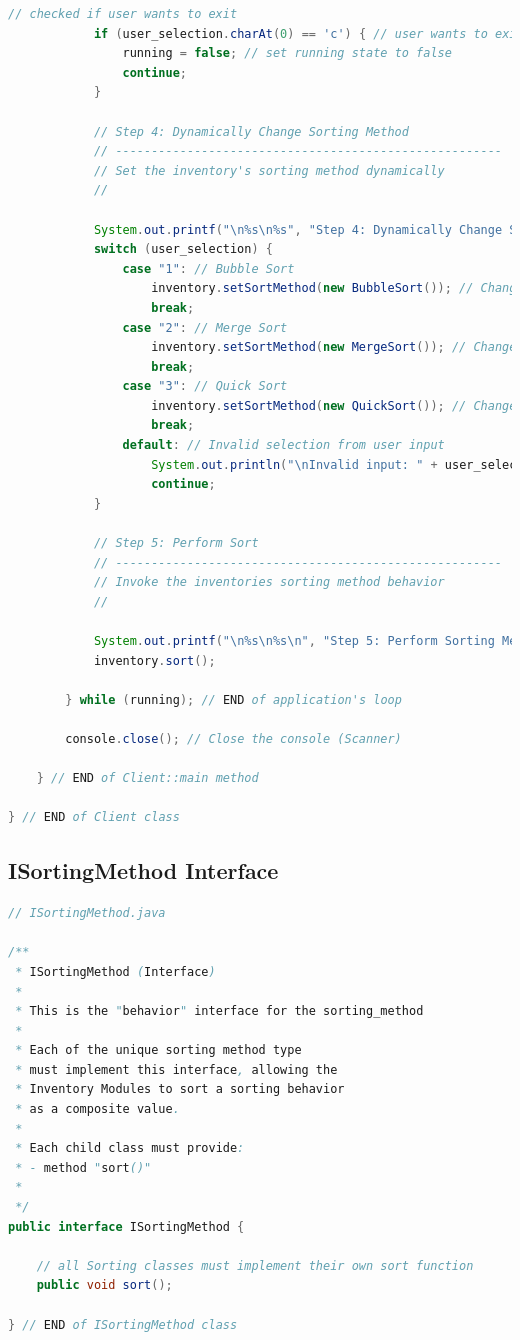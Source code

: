 \documentclass[12pt]{article}
\begin{document}
\begin{lstlisting}[language=Java]
            // checked if user wants to exit
            if (user_selection.charAt(0) == 'c') { // user wants to exit
                running = false; // set running state to false
                continue;
            }

            // Step 4: Dynamically Change Sorting Method
            // ------------------------------------------------------
            // Set the inventory's sorting method dynamically
            //
            
            System.out.printf("\n%s\n%s", "Step 4: Dynamically Change Sorting Method", dv);
            switch (user_selection) {
                case "1": // Bubble Sort
                    inventory.setSortMethod(new BubbleSort()); // Change dynamically to BubbleSort
                    break;
                case "2": // Merge Sort
                    inventory.setSortMethod(new MergeSort()); // Change dynamically to MergeSort
                    break;
                case "3": // Quick Sort
                    inventory.setSortMethod(new QuickSort()); // Change dynamically to QuickSort
                    break;
                default: // Invalid selection from user input
                    System.out.println("\nInvalid input: " + user_selection);
                    continue;
            }

            // Step 5: Perform Sort
            // ------------------------------------------------------
            // Invoke the inventories sorting method behavior
            //
            
            System.out.printf("\n%s\n%s\n", "Step 5: Perform Sorting Method", dv);
            inventory.sort();

        } while (running); // END of application's loop
        
        console.close(); // Close the console (Scanner)
        
    } // END of Client::main method

} // END of Client class

\end{lstlisting}


\subsection*{ISortingMethod Interface}
\begin{lstlisting}[language=Java]
// ISortingMethod.java

/**
 * ISortingMethod (Interface)
 * 
 * This is the "behavior" interface for the sorting_method
 * 
 * Each of the unique sorting method type
 * must implement this interface, allowing the
 * Inventory Modules to sort a sorting behavior
 * as a composite value.
 * 
 * Each child class must provide:
 * - method "sort()"
 *
 */
public interface ISortingMethod {
    
    // all Sorting classes must implement their own sort function
    public void sort();
    
} // END of ISortingMethod class

\end{lstlisting}
\end{document}
